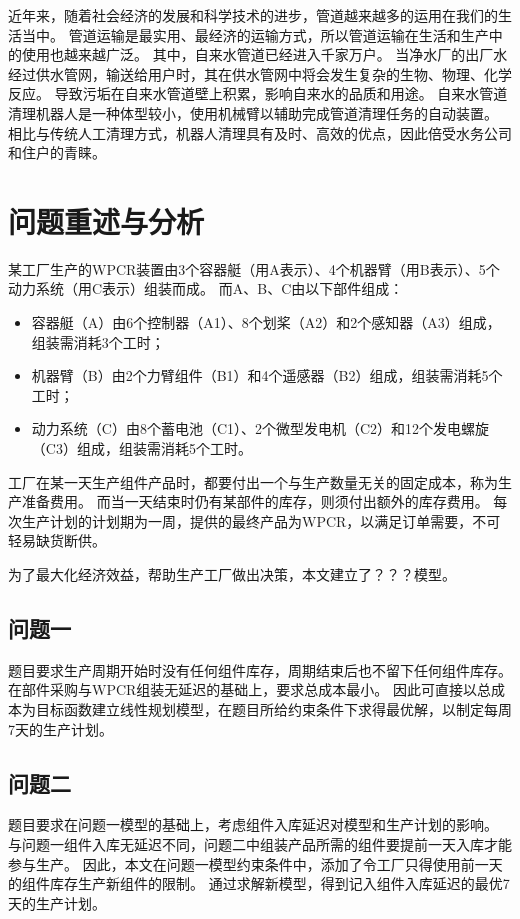 近年来，随着社会经济的发展和科学技术的进步，管道越来越多的运用在我们的生活当中。
管道运输是最实用、最经济的运输方式，所以管道运输在生活和生产中的使用也越来越广泛\cite{智能管道清理机器人}。
其中，自来水管道已经进入千家万户。
当净水厂的出厂水经过供水管网，输送给用户时，其在供水管网中将会发生复杂的生物、物理、化学反应\cite{基于升力法的贯流式水轮机叶片设计及可行性分析}。
导致污垢在自来水管道壁上积累，影响自来水的品质和用途。
自来水管道清理机器人是一种体型较小，使用机械臂以辅助完成管道清理任务的自动装置。
相比与传统人工清理方式，机器人清理具有及时、高效的优点，因此倍受水务公司和住户的青睐。

\section{问题重述与分析}
某工厂生产的WPCR装置由3个容器艇（用A表示）、4个机器臂（用B表示）、5个动力系统（用C表示）组装而成。
而A、B、C由以下部件组成：
\begin{itemize}
\item 容器艇（A）由6个控制器（A1）、8个划桨（A2）和2个感知器（A3）组成，组装需消耗3个工时；
\item 机器臂（B）由2个力臂组件（B1）和4个遥感器（B2）组成，组装需消耗5个工时；
\item 动力系统（C）由8个蓄电池（C1）、2个微型发电机（C2）和12个发电螺旋（C3）组成，组装需消耗5个工时。
\end{itemize}

工厂在某一天生产组件产品时，都要付出一个与生产数量无关的固定成本，称为生产准备费用。
而当一天结束时仍有某部件的库存，则须付出额外的库存费用。
每次生产计划的计划期为一周，提供的最终产品为WPCR，以满足订单需要，不可轻易缺货断供。

为了最大化经济效益，帮助生产工厂做出决策，本文建立了？？？模型。

\subsection{问题一}
题目要求生产周期开始时没有任何组件库存，周期结束后也不留下任何组件库存。
在部件采购与WPCR组装无延迟的基础上，要求总成本最小。
因此可直接以总成本为目标函数建立线性规划模型，在题目所给约束条件下求得最优解，以制定每周7天的生产计划。


\subsection{问题二}
题目要求在问题一模型的基础上，考虑组件入库延迟对模型和生产计划的影响。
与问题一组件入库无延迟不同，问题二中组装产品所需的组件要提前一天入库才能参与生产。
因此，本文在问题一模型约束条件中，添加了令工厂只得使用前一天的组件库存生产新组件的限制。
通过求解新模型，得到记入组件入库延迟的最优7天的生产计划。

